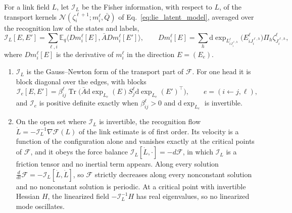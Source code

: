\documentclass[twoside,11pt]{article}
\begin{document}
\begin{proposition}
\label{prop:app_fisher_flow}
For a link field $L$, let $\mathcal I_L$ be the Fisher information, with respect to $L$, of the transport kernels $\mathcal N(\zeta_i^{\ell+1};m_i^\ell,\bar Q)$ of Eq.~\eqref{eq:lie_latent_model}, averaged over the recognition law of the states and labels,
\begin{equation}
\mathcal I_L[E,E']=\sum_{\ell,i}\mathbb E_q\bigl\langle Dm_i^\ell[E],\bar ADm_i^\ell[E']\bigr\rangle,\qquad
Dm_i^\ell[E]=\sum_h\mathrm d\exp_{L_{iJ_i^{\ell,h}}^\ell}\bigl(E_{iJ_i^{\ell,h}}^\ell\bigr)\Pi_h\zeta_{J_i^{\ell,h}}^\ell,
\label{eq:app_fisher}
\end{equation}
where $Dm_i^\ell[E]$ is the derivative of $m_i^\ell$ in the direction $E=(E_e)$.
\begin{enumerate}
\item $\mathcal I_L$ is the Gauss--Newton form of the transport part of $\mathcal F$. For one head it is block diagonal over the edges, with blocks
\begin{equation}
\mathcal I_e[E,E']=\beta_{ij}^\ell\operatorname{Tr}\bigl(\bar A\mathrm d\exp_{L_e}(E)S_j^\ell\mathrm d\exp_{L_e}(E')^\top\bigr),\qquad e=(i\leftarrow j,\ell),
\label{eq:app_fisher_onehead}
\end{equation}
and $\mathcal I_e$ is positive definite exactly when $\beta_{ij}^\ell>0$ and $\mathrm d\exp_{L_e}$ is invertible.
\item On the open set where $\mathcal I_L$ is invertible, the recognition flow $\dot L=-\mathcal I_L^{-1}\nabla\mathcal F(L)$ of the link estimate is of first order. Its velocity is a function of the configuration alone and vanishes exactly at the critical points of $\mathcal F$, and it obeys the force balance $\mathcal I_L[\dot L,\cdot]=-d\mathcal F$, in which $\mathcal I_L$ is a friction tensor and no inertial term appears. Along every solution $\tfrac{d}{dt}\mathcal F=-\mathcal I_L[\dot L,\dot L]$, so $\mathcal F$ strictly decreases along every nonconstant solution and no nonconstant solution is periodic. At a critical point with invertible Hessian $H$, the linearized field $-\mathcal I_L^{-1}H$ has real eigenvalues, so no linearized mode oscillates.
\end{enumerate}
\end{proposition}
\end{document}
